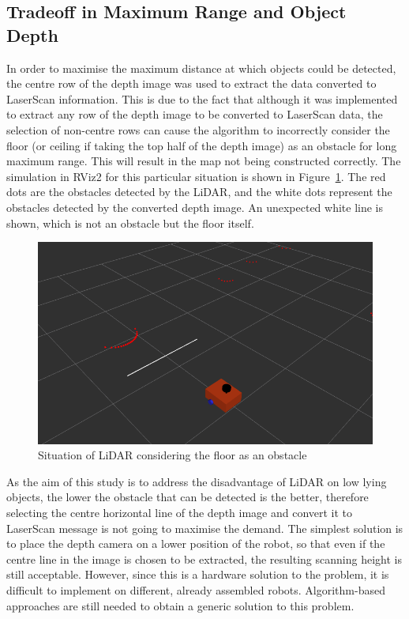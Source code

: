 \subsection{Tradeoff in Maximum Range and Object Depth}
\label{subsec:tradeoff}
In order to maximise the maximum distance at which objects could be detected, 
the centre row of the depth image was used to extract the data converted to LaserScan information. 
This is due to the fact that although it was implemented to extract any row of the depth image to be converted to LaserScan data, 
the selection of non-centre rows can cause the algorithm to incorrectly consider the floor (or ceiling if taking the top half of the depth image) 
as an obstacle for long maximum range. This will result in the map not being constructed correctly. 
The simulation in RViz2 for this particular situation is shown in Figure~\ref{fig:floor_obstacle}.
The red dots are the obstacles detected by the LiDAR, and the white dots represent the obstacles detected by the converted depth image. 
An unexpected white line is shown, which is not an obstacle but the floor itself.
\begin{figure}[H]
    \centering
    \includegraphics[width=0.8\linewidth]{figs/ground_obs.png}
    \caption{Situation of LiDAR considering the floor as an obstacle}
    \label{fig:floor_obstacle}
\end{figure}
As the aim of this study is to address the disadvantage of LiDAR on low lying objects, 
the lower the obstacle that can be detected is the better, 
therefore selecting the centre horizontal line of the depth image 
and convert it to LaserScan message is not going to maximise the demand. 
The simplest solution is to place the depth camera on a lower position of the robot, 
so that even if the centre line in the image is chosen to be extracted, 
the resulting scanning height is still acceptable. 
However, since this is a hardware solution to the problem, 
it is difficult to implement on different, already assembled robots. 
Algorithm-based approaches are still needed to obtain a generic solution to this problem. 

